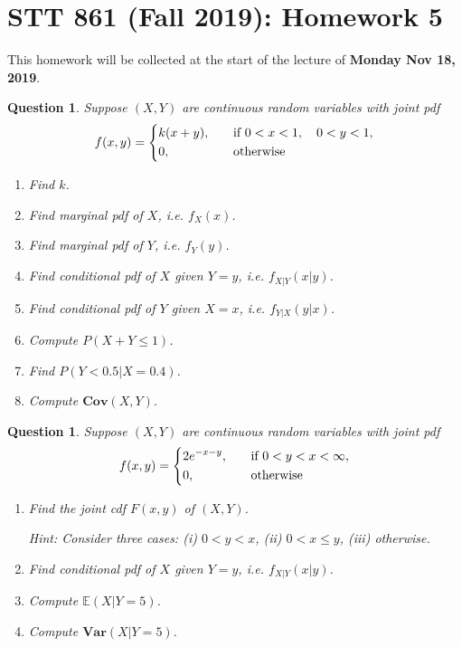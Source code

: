 \documentclass[11pt]{notes}
\newtheorem{qn}[thm]{Question}
\begin{document}
\section*{STT 861 (Fall 2019): Homework 5}

This homework will be collected at the start of the lecture of \textbf{Monday Nov 18, 2019}. \bigskip

\begin{qn}
Suppose $(X,Y)$ are continuous random variables with joint pdf
$$
f(x,y) =
\begin{dcases}
  k(x+y), & \quad \text{if } 0 < x < 1, \quad 0 < y < 1, \\
  0, & \quad \text{otherwise}
\end{dcases}
$$
\begin{enumerate}
  \item Find $k$.
  \item Find marginal pdf of $X$, \thickspace i.e. $f_X(x)$.
  \item Find marginal pdf of $Y$, \thickspace i.e. $f_Y(y)$.
  \item Find conditional pdf of $X$ given $Y=y$, \thickspace i.e. $f_{X|Y}(x|y)$.
  \item Find conditional pdf of $Y$ given $X=x$, \thickspace i.e. $f_{Y|X}(y|x)$.
  \item Compute $P(X+Y \leq 1)$.
  \item Find $P(Y < 0.5 | X = 0.4)$.
  \item Compute $\textbf{Cov}(X,Y)$.
\end{enumerate}
\end{qn} \bigskip


\begin{qn}
Suppose $(X,Y)$ are continuous random variables with joint pdf
$$
f(x,y) =
\begin{dcases}
  2e^{-x-y}, & \quad \text{if } 0 < y < x < \infty, \\
  0, & \quad \text{otherwise}
\end{dcases}
$$
\begin{enumerate}
  \item Find the joint cdf $F(x,y)$ of $(X,Y)$. \par
  Hint: Consider three cases: (i) $0 < y < x$, (ii) $0 < x \leq y$, (iii) otherwise.
  \item Find conditional pdf of $X$ given $Y=y$, \thickspace i.e. $f_{X|Y}(x|y)$.
  \item Compute $\mathbb{E}(X|Y=5)$.
  \item Compute $\textbf{Var}(X|Y=5)$.
\end{enumerate}
\end{qn} \bigskip
\end{document}
